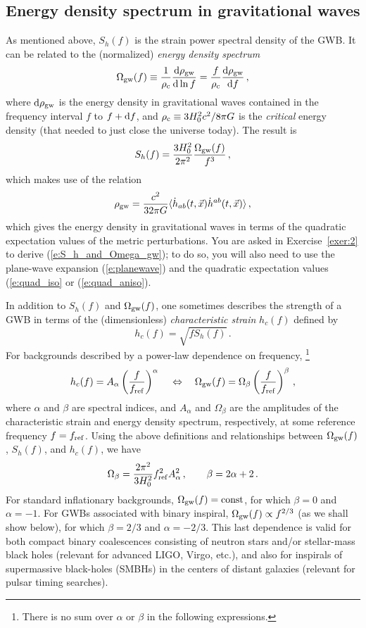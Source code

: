 \documentclass[11pt]{article}
\numberwithin{equation}{section}
\def\be{\begin{equation}}
\def\ee{\end{equation}}
\def\D{{\rm d}}
\begin{document}
\subsection{Energy density spectrum in gravitational waves}
\label{s:Omega_gw}

As mentioned above, $S_h(f)$ is the strain power 
spectral density of the GWB.
It can be related to the (normalized) 
{\em energy density spectrum}
%
\be
\Omega_{\rm gw}(f) 
\equiv \frac{1}{\rho_{\rm c}}\frac{\D\rho_{\rm gw}}{\D\ln f}
=\frac{f}{\rho_{\rm c}}\frac{\D\rho_{\rm gw}}{\D f}\,,
\label{e:Omega_gw}
\ee
%
where $\D\rho_{\rm gw}$ is the energy density in gravitational
waves contained in the frequency interval $f$ to $f+\D f$, and 
$\rho_{\rm c}\equiv {3 H_0^2 c^2}/{8\pi G}$
is the {\em critical} energy density (that needed to just 
close the universe today).
The result is 
%
\be
S_h(f) = \frac{3H_0^2}{2\pi^2}\frac{\Omega_{\rm gw}(f)}{f^3}\,,
\label{e:S_h_and_Omega_gw}
\ee
%
which makes use of the relation
%
\be
\rho_{\rm gw} = \frac{c^2}{32\pi G}
\langle \dot h_{ab}(t,\vec x)\dot h^{ab}(t,\vec x)\rangle\,,
\label{e:rho_gw}
\ee
%
which gives the energy density in gravitational waves
in terms of the quadratic expectation values of the
metric perturbations.
You are asked in Exercise~\ref{exer:2} to derive
(\ref{e:S_h_and_Omega_gw}); to do so, 
you will also need to use the 
plane-wave expansion (\ref{e:planewave})
and the quadratic expectation values 
(\ref{e:quad_iso} or (\ref{e:quad_aniso}).

In addition to $S_h(f)$ and $\Omega_{\rm gw}(f)$, one
sometimes describes the strength of a GWB in terms of
the (dimensionless) {\em characteristic strain}
$h_c(f)$ defined by
%
\be
h_c(f) = \sqrt{f S_h(f)}\,.
\ee
%
For backgrounds described by a power-law dependence
on frequency,%
\footnote{There is no sum over $\alpha$ or $\beta$ in 
the following expressions.}
%
\be
h_c(f) = A_\alpha \left(\frac{f}{f_{\rm ref}}\right)^\alpha\,
\quad\Leftrightarrow\quad
\Omega_{\rm gw}(f) = \Omega_\beta\left(\frac{f}{f_{\rm ref}}\right)^\beta\,,
\label{e:powerlaw}
\ee
%
where $\alpha$ and $\beta$ are spectral indices,
and $A_\alpha$ and $\Omega_\beta$ are the amplitudes 
of the characteristic strain and energy density 
spectrum, respectively, at some reference frequency
$f=f_{\rm ref}$.
Using the above definitions and relationships between
$\Omega_{\rm gw}(f)$, $S_h(f)$, and $h_c(f)$, we have
%
\be
\Omega_\beta = \frac{2\pi^2}{3 H_0^2}f_{\rm ref}^2 A_\alpha^2\,,
\qquad
\beta = 2\alpha +2\,.
\ee
%
For standard inflationary backgrounds, $\Omega_{\rm gw}(f)={\rm const}$,
for which $\beta=0$ and $\alpha=-1$.
For GWBs associated with binary inspiral, 
$\Omega_{\rm gw}(f)\propto f^{2/3}$ (as we shall show below),
for which $\beta=2/3$ and $\alpha=-2/3$.
This last dependence is valid for both compact binary coalescences 
consisting of neutron stars and/or 
stellar-mass black holes (relevant for advanced LIGO, Virgo, etc.),
and also for inspirals of supermassive black-holes (SMBHs) 
in the centers of distant galaxies (relevant for pulsar timing searches).
 
\end{document}
